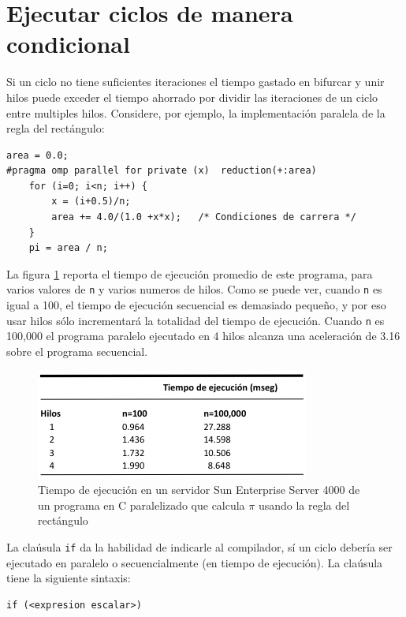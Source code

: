 \documentclass[12pt,letterpaper]{book}
\begin{document}
\section{Ejecutar ciclos de manera condicional}
Si un ciclo no tiene suficientes iteraciones el tiempo gastado en bifurcar y unir hilos puede exceder el tiempo ahorrado por dividir las iteraciones de un ciclo entre multiples hilos. Considere, por ejemplo, la implementación paralela de la regla del rectángulo:

\begin{lstlisting}[style=C]
area = 0.0;
#pragma omp parallel for private (x)  reduction(+:area)
	for (i=0; i<n; i++) {
		x = (i+0.5)/n;
		area += 4.0/(1.0 +x*x);   /* Condiciones de carrera */
	}
	pi = area / n;
\end{lstlisting}

La figura \ref{fig:time_pi} reporta el tiempo de ejecución promedio de este programa, para varios valores de \texttt{n} y varios numeros de hilos. Como se puede ver,  cuando \texttt{n} es igual a 100, el tiempo de ejecución secuencial es demasiado pequeño, y por eso usar hilos sólo incrementará la totalidad del tiempo de ejecución. Cuando \texttt{n} es 100,000 el programa paralelo ejecutado en 4 hilos alcanza una aceleración de 3.16 sobre el programa secuencial.

\begin{figure}
\begin{center}
\includegraphics[width=9cm]{../imagenes/time_pi.png} 
\end{center}
\caption{Tiempo de ejecución en un servidor Sun Enterprise Server 4000 de un programa en C paralelizado que calcula $\pi$ usando la regla del rectángulo}
\label{fig:time_pi}
\end{figure}

La claúsula \texttt{if} da la habilidad de indicarle al compilador, sí un ciclo debería ser ejecutado en paralelo o secuencialmente (en tiempo de ejecución). La claúsula tiene la siguiente sintaxis:

\begin{lstlisting}[style=C]
if (<expresion escalar>)
\end{lstlisting}
\end{document}
